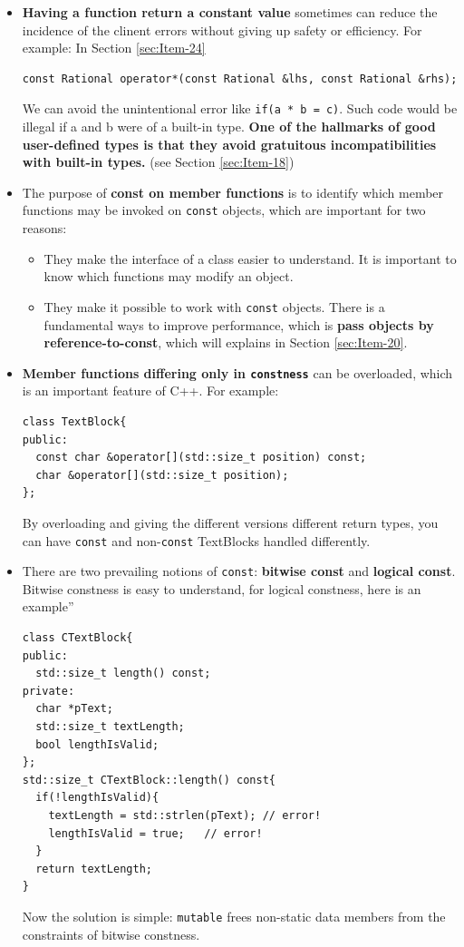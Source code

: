 \begin{itemize}
\item \textbf{Having a function return a constant value} sometimes can reduce
  the incidence of the clinent errors without giving up safety or
  efficiency. For example: In Section \ref{sec:Item-24}
\begin{verbatim}
const Rational operator*(const Rational &lhs, const Rational &rhs);
\end{verbatim}
  We can avoid the unintentional error like \texttt{if(a * b = c)}.
  Such code would be illegal if a and b were of a built-in
  type. \textbf{ One of the hallmarks of good user-defined types is
    that they avoid gratuitous incompatibilities with built-in types.}
  (see Section \ref{sec:Item-18})
\item The purpose of \textbf{const on member functions} is to identify
  which member functions may be invoked on \texttt{const} objects,
  which are important for two reasons:
  \begin{itemize}
  \item They make the interface of a class easier to understand. It is
    important to know which functions may modify an object.
  \item They make it possible to work with \texttt{const}
    objects. There is a fundamental ways to improve performance, which
    is \textbf{pass objects by reference-to-const}, which will
    explains in Section \ref{sec:Item-20}.
  \end{itemize}
\item \textbf{Member functions differing only in \texttt{constness}}
  can be overloaded, which is an important feature of C++. For
  example:
\begin{verbatim}
class TextBlock{
public:
  const char &operator[](std::size_t position) const;
  char &operator[](std::size_t position);
};
\end{verbatim}
By overloading and giving the different versions different return
types, you can have \texttt{const} and non-\texttt{const} TextBlocks
handled differently.
\item There are two prevailing notions of \texttt{const}:
  \textbf{bitwise const} and \textbf{logical const}. Bitwise constness
  is easy to understand, for logical constness, here is an example''
\begin{verbatim}
class CTextBlock{
public:
  std::size_t length() const;
private:
  char *pText;
  std::size_t textLength;
  bool lengthIsValid;
};
std::size_t CTextBlock::length() const{
  if(!lengthIsValid){
    textLength = std::strlen(pText); // error!
    lengthIsValid = true;   // error!
  }
  return textLength;
}
\end{verbatim}
Now the solution is simple: \texttt{mutable} frees non-static data
members from the constraints of bitwise constness.


\end{itemize}
